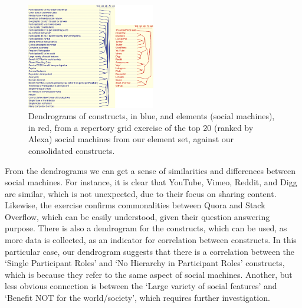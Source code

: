 \documentclass{www13-companion-accepted}
\begin{document}
\begin{figure}[htb]
\begin{center}
\includegraphics[width=0.5\textwidth]{img/dendrogram-both}
\caption{Dendrograms of constructs, in blue, and elements (social machines), in red, from a repertory grid exercise of the top $20$ (ranked by Alexa) social machines from our element set, against our consolidated constructs.} \label{dendrogram}
\end{center}
\end{figure}

%

From the dendrograms we can get a sense of similarities and differences between social machines. For
instance, it is clear that YouTube, Vimeo, Reddit, and Digg are similar, which is not unexpected, due to their focus on sharing content. Likewise, the exercise confirms commonalities between Quora and Stack Overflow, which can be easily understood, given their question answering purpose. There is also a dendrogram for the constructs, which can be used, as more data is collected, as an indicator for correlation between constructs. In this particular case, our dendrogram suggests that there is a correlation between the `Single Participant Roles' and `No Hierarchy in Participant Roles' constructs, which is because they refer to the same aspect of social machines. Another, but less obvious connection is between the `Large variety of social features' and `Benefit NOT for the world/society', which requires further investigation.
\end{document}
